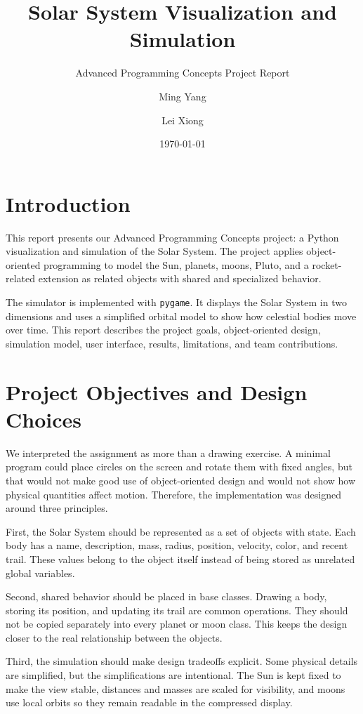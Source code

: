 \documentclass[a4paper,12pt]{article}
\title{Solar System Visualization and Simulation}
\subtitle{Advanced Programming Concepts Project Report}
\author{  Ming Yang \and Lei Xiong}
\date{\today}
\begin{document}
\maketitle

\section{Introduction}

This report presents our Advanced Programming Concepts project: a Python
visualization and simulation of the Solar System. The project applies
object-oriented programming to model the Sun, planets, moons, Pluto, and a
rocket-related extension as related objects with shared and specialized
behavior.

The simulator is implemented with \texttt{pygame}. It displays the Solar System
in two dimensions and uses a simplified orbital model to show how celestial
bodies move over time. This report describes the project goals, object-oriented
design, simulation model, user interface, results, limitations, and team
contributions.

\section{Project Objectives and Design Choices}

We interpreted the assignment as more than a drawing exercise. A minimal
program could place circles on the screen and rotate them with fixed angles,
but that would not make good use of object-oriented design and would not show
how physical quantities affect motion. Therefore, the implementation was
designed around three principles.

First, the Solar System should be represented as a set of objects with state.
Each body has a name, description, mass, radius, position, velocity, color, and
recent trail. These values belong to the object itself instead of being stored
as unrelated global variables.

Second, shared behavior should be placed in base classes. Drawing a body,
storing its position, and updating its trail are common operations. They should
not be copied separately into every planet or moon class. This keeps the design
closer to the real relationship between the objects.

Third, the simulation should make design tradeoffs explicit. Some physical
details are simplified, but the simplifications are intentional. The Sun is
kept fixed to make the view stable, distances and masses are scaled for
visibility, and moons use local orbits so they remain readable in the compressed
display.
\end{document}
